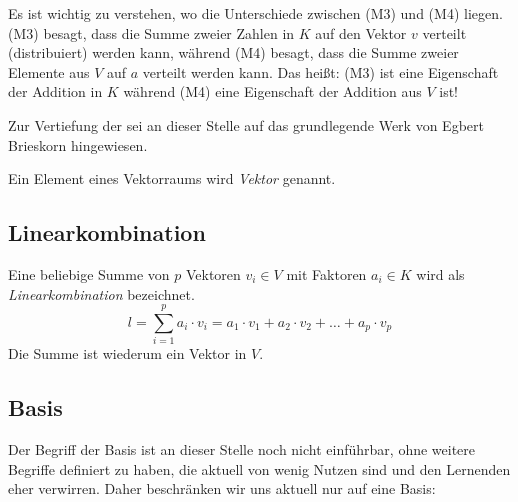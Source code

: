 Es ist wichtig zu verstehen, wo die Unterschiede zwischen (M3) und (M4) liegen. (M3) besagt, dass die Summe zweier Zahlen in $K$ auf den Vektor $v$ verteilt (distribuiert) werden kann, während (M4) besagt, dass die Summe zweier Elemente aus $V$ auf $a$ verteilt werden kann. Das heißt: (M3) ist eine Eigenschaft der Addition in $K$ während (M4) eine Eigenschaft der Addition aus $V$ ist! 

\begin{svgraybox}
Zur Vertiefung der sei an dieser Stelle auf das grundlegende Werk von Egbert Brieskorn \cite{Brieskorn1} hingewiesen. 
\end{svgraybox}

\begin{definition}
Ein Element eines Vektorraums wird \textsl{Vektor} genannt.
\end{definition}

\subsection{Linearkombination}

\begin{definition}
Eine beliebige Summe von $p$ Vektoren $v_i \in V$ mit Faktoren $a_i \in K$ wird als \textsl{Linearkombination} bezeichnet.
\[
l = \sum_{i=1}^{p} a_i \cdot v_i = a_1\cdot v_1 + a_2 \cdot v_2 + \dots + a_p \cdot v_p
\]
Die Summe ist wiederum ein Vektor in $V$.

\end{definition}

\subsection{Basis}

Der Begriff der Basis ist an dieser Stelle noch nicht einführbar, ohne weitere Begriffe definiert zu haben, die aktuell von wenig Nutzen sind und den Lernenden eher verwirren. Daher beschränken wir uns aktuell nur auf eine Basis:

